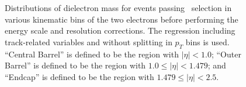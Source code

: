 \documentclass{cmspaper}
\begin{document}
\begin{figure}[h]
{  } 
  \caption{Distributions of dielectron mass for events passing \ZToEE\ selection in various kinematic bins of the
  two electrons before performing the energy scale and resolution corrections. The regression including track-related variables
  and without splitting in $p_{T}$ bins is used. ``Central Barrel'' is defined to be the region with
  $|\eta| < 1.0$; ``Outer Barrel'' is defined to be the region with $1.0 \le |\eta| < 1.479$; and ``Endcap''
  is defined to be the region with $1.479 \le |\eta| < 2.5$. } 
  \label{fig:ZMassValidation_BeforeCorr} 
\end{figure}
\end{document}

